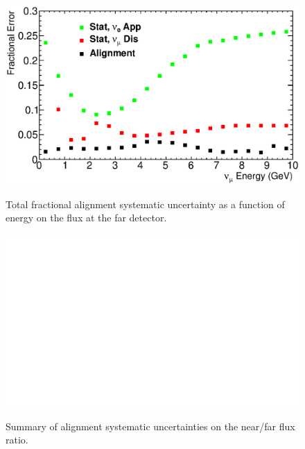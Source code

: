 \begin{figure}[ht]
  \begin{center}
    {\includegraphics[width=6.0in]{figures/tot_error_far.eps}}
  \end{center}
\caption{ Total fractional alignment systematic uncertainty as a function of energy on the flux at the far detector. }
\end{figure}

\begin{figure}[ht]
  \begin{center}
    {\includegraphics[width=6.0in]{figures/error_summary_nof.eps}}
  \end{center}
\caption{ Summary of alignment systematic uncertainties on the near/far flux ratio.}
\end{figure}

